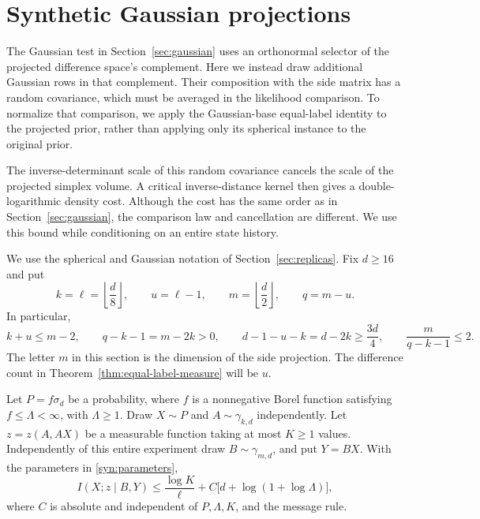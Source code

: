 \section{Synthetic Gaussian projections}\label{sec:synthetic}

The Gaussian test in Section~\ref{sec:gaussian} uses an orthonormal
selector of the projected difference space's complement.  Here we instead
draw additional Gaussian rows in that complement.  Their composition with
the side matrix has a random covariance, which must be averaged in the
likelihood comparison.  To normalize that comparison, we apply the
Gaussian-base equal-label identity to the projected prior, rather than
applying only its spherical instance to the original prior.

The inverse-determinant scale of this random covariance cancels the scale
of the projected simplex volume.  A critical inverse-distance kernel then
gives a double-logarithmic density cost.  Although the cost has the same
order as in Section~\ref{sec:gaussian}, the comparison law and cancellation
are different.  We use this bound while conditioning on an entire state
history.

We use the spherical and Gaussian notation of Section~\ref{sec:replicas}.
Fix \(d\ge16\) and put
\begin{equation}\label{syn:parameters}
 k=\ell=\left\lfloor\frac d8\right\rfloor,\qquad
 u=\ell-1,\qquad m=\left\lfloor\frac d2\right\rfloor,\qquad q=m-u.
\end{equation}
In particular,
\begin{equation}\label{syn:dimension-margins}
 k+u\le m-2,\qquad q-k-1=m-2k>0,\qquad
 d-1-u-k=d-2k\ge\frac{3d}{4},\qquad
 \frac{m}{q-k-1}\le2.
\end{equation}
The letter \(m\) in this section is the dimension of the side projection.
The difference count in Theorem~\ref{thm:equal-label-measure} will be \(u\).

\begin{proposition}
\label{syn:block}
Let \(P=f\sigma_d\) be a probability, where \(f\) is a nonnegative Borel
function satisfying \(f\le\Lambda<\infty\), with \(\Lambda\ge1\).
Draw \(X\sim P\) and \(A\sim\gamma_{k,d}\) independently.  Let
\(z=z(A,AX)\) be a measurable function taking at most \(K\ge1\) values.
Independently of this entire experiment draw \(B\sim\gamma_{m,d}\), and put
\(Y=BX\).  With the parameters in \eqref{syn:parameters},
\begin{equation}\label{syn:block-bound}
 I(X;z\mid B,Y)
 \le \frac{\log K}{\ell}
       +C\bigl[d+\log(1+\log\Lambda)\bigr],
\end{equation}
where \(C\) is absolute and independent of \(P,\Lambda,K\), and the message
rule.
\end{proposition}

